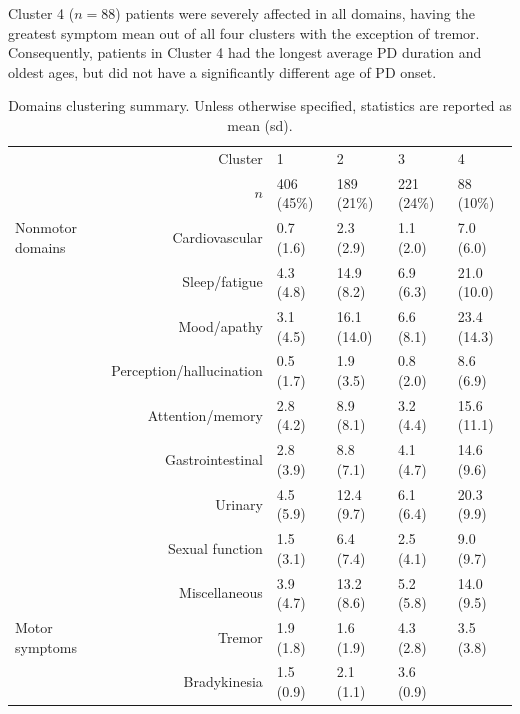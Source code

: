 \documentclass[preprint,5p]{elsarticle} %
\begin{document}
Cluster 4 ($n = 88$) patients were severely affected in all domains, having the greatest symptom
mean out of all four clusters with the exception of tremor. Consequently, patients in Cluster 4 had
the longest average PD duration and oldest ages, but did not have a significantly different age of
PD onset.

\begin{table}[t]
  \centering
  \caption{Domains clustering summary. Unless otherwise specified, statistics are
  reported as mean (sd).}
  \label{tab:nmd}
  \begin{threeparttable}
    \small
    \begin{tabular}{lrllll}
    \toprule
    & Cluster & 1 & 2 & 3 & 4 \\
    & $n$ & 406 (45\%) & 189 (21\%) & 221 (24\%) & 88 (10\%) \\
    \midrule
    Nonmotor domains & Cardiovascular & 0.7 (1.6)\tnote{24} & 2.3 (2.9)\tnote{134} & 1.1 (2.0)\tnote{24} &
    7.0 (6.0)\tnote{123} \\
    & Sleep/fatigue & 4.3 (4.8)\tnote{234} & 14.9 (8.2)\tnote{134} & 6.9 (6.3)\tnote{124}
    & 21.0 (10.0)\tnote{123} \\
  & Mood/apathy & 3.1 (4.5)\tnote{234} & 16.1 (14.0)\tnote{134} & 6.6
    (8.1)\tnote{124} & 23.4 (14.3)\tnote{123} \\
    & Perception/hallucination & 0.5 (1.7)\tnote{24} & 1.9 (3.5)\tnote{134} & 0.8
    (2.0)\tnote{24} & 8.6 (6.9)\tnote{123} \\
    & Attention/memory & 2.8 (4.2)\tnote{24} & 8.9 (8.1)\tnote{134} & 3.2 (4.4)\tnote{24} &
    15.6 (11.1)\tnote{123} \\
    & Gastrointestinal & 2.8 (3.9)\tnote{234} & 8.8 (7.1)\tnote{134} & 4.1
    (4.7)\tnote{124} & 14.6 (9.6)\tnote{123} \\
    & Urinary & 4.5 (5.9)\tnote{234} & 12.4 (9.7)\tnote{134} & 6.1 (6.4)\tnote{124} &
    20.3 (9.9)\tnote{123} \\
    & Sexual function & 1.5 (3.1)\tnote{24} & 6.4 (7.4)\tnote{134} & 2.5 (4.1)\tnote{24} &
    9.0 (9.7)\tnote{123} \\
    & Miscellaneous & 3.9 (4.7)\tnote{24} & 13.2 (8.6)\tnote{13} & 5.2 (5.8)\tnote{24} &
    14.0 (9.5)\tnote{13} \\
    \midrule
    Motor symptoms & Tremor & 1.9 (1.8)\tnote{34} & 1.6 (1.9)\tnote{34} & 4.3 (2.8)\tnote{124} & 3.5
    (3.8)\tnote{123} \\
    & Bradykinesia & 1.5 (0.9)\tnote{234} & 2.1 (1.1)\tnote{134} & 3.6 (0.9)\tnote{124} &

\end{tabular}
\end{threeparttable}
\end{table}
\end{document}
